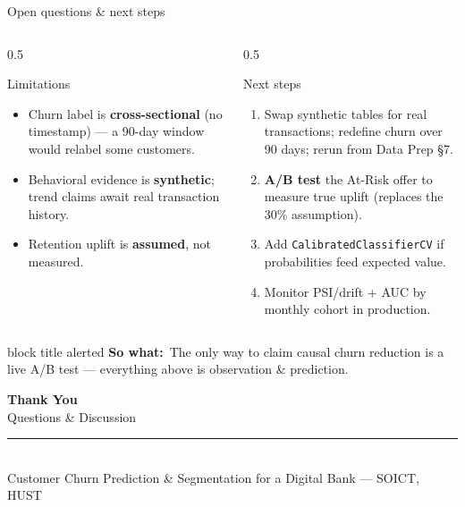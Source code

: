 \documentclass[11pt,aspectratio=169]{beamer}
\newcommand{\sowhat}[1]{%
  \vspace{2pt}\begin{beamercolorbox}[wd=\textwidth,sep=4pt,rounded=true]{block title alerted}%
  \footnotesize\textbf{So what:}~#1\end{beamercolorbox}}
\begin{document}
\begin{frame}{Open questions \& next steps}
  \begin{columns}[T]
    \begin{column}{0.5\textwidth}
      \begin{block}{\small Limitations}
        \footnotesize
        \begin{itemize}
          \item Churn label is \textbf{cross-sectional} (no timestamp) --- a 90-day window would relabel some customers.
          \item Behavioral evidence is \textbf{synthetic}; trend claims await real transaction history.
          \item Retention uplift is \textbf{assumed}, not measured.
        \end{itemize}
      \end{block}
    \end{column}
    \begin{column}{0.5\textwidth}
      \begin{exampleblock}{\small Next steps}
        \footnotesize
        \begin{enumerate}
          \item Swap synthetic tables for real transactions; redefine churn over 90 days; rerun from Data Prep §7.
          \item \textbf{A/B test} the At-Risk offer to measure true uplift (replaces the 30\% assumption).
          \item Add \texttt{CalibratedClassifierCV} if probabilities feed expected value.
          \item Monitor PSI/drift + AUC by monthly cohort in production.
        \end{enumerate}
      \end{exampleblock}
    \end{column}
  \end{columns}
  \sowhat{The only way to claim causal churn reduction is a live A/B test --- everything above is observation \& prediction.}
\end{frame}

\begin{frame}[noframenumbering]{}
  \begin{center}
    \vspace{0.8cm}
    {\huge \textbf{Thank You}}\\[0.4cm]
    {\large Questions \& Discussion}\\[0.8cm]
    \rule{0.65\textwidth}{0.4pt}\\[0.3cm]
    {\footnotesize Customer Churn Prediction \& Segmentation for a Digital Bank --- SOICT, HUST}
  \end{center}
\end{frame}
\end{document}
